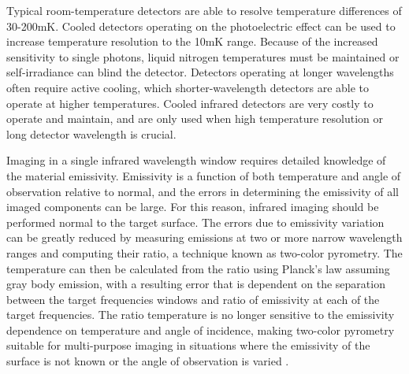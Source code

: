 \documentclass{jpp}
\begin{document}
Typical room-temperature detectors are able to resolve temperature differences of 30-200mK. Cooled detectors operating on the photoelectric effect can be used to increase temperature resolution to the 10mK range. Because of the increased sensitivity to single photons, liquid nitrogen temperatures must be maintained or self-irradiance can blind the detector. Detectors operating at longer wavelengths often require active cooling, which shorter-wavelength detectors are able to operate at higher temperatures. Cooled infrared detectors are very costly to operate and maintain, and are only used when high temperature resolution or long detector wavelength is crucial.

Imaging in a single infrared wavelength window requires detailed knowledge of the material emissivity. Emissivity is a function of both temperature and angle of observation relative to normal, and the errors in determining the emissivity of all imaged components can be large. For this reason, infrared imaging should be performed normal to the target surface. The errors due to emissivity variation can be greatly reduced by measuring emissions at two or more narrow wavelength ranges and computing their ratio, a technique known as two-color pyrometry. The temperature can then be calculated from the ratio using Planck's law assuming gray body emission, with a resulting error that is dependent on the separation between the target frequencies windows and ratio of emissivity at each of the target frequencies. The ratio temperature is no longer sensitive to the emissivity dependence on temperature and angle of incidence, making two-color pyrometry suitable for multi-purpose imaging in situations where the emissivity of the surface is not known or the angle of observation is varied \citep{MullerB2001Doaf}.



 
\end{document}
